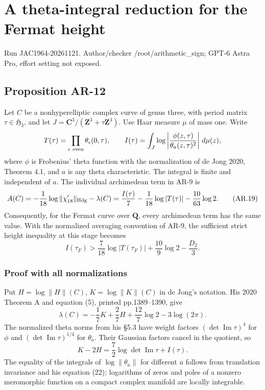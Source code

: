 \section{A theta-integral reduction for the Fermat
height}\label{a-theta-integral-reduction-for-the-fermat-height}

Run JAC1964-20261121. Author/checker /root/arithmetic\_sign; GPT-6 Astra
Pro, effort setting not exposed.

\subsection{Proposition AR-12}\label{proposition-ar-12}

Let \(C\) be a nonhyperelliptic complex curve of genus three, with
period matrix \(\tau\in\mathfrak H_3\), and let
\(J=\mathbf C^3/(\mathbf Z^3+\tau\mathbf Z^3)\). Use Haar measure
\(\mu\) of mass one. Write \[
T(\tau)=\prod_{\epsilon\ {\rm even}}\theta_\epsilon(0,\tau),
\qquad
I(\tau)=\int_J\log\left|
  \frac{\phi(z,\tau)}{\theta_a(z,\tau)^2}
\right|\,d\mu(z),
\] where \(\phi\) is Frobenius' theta function with the normalization of
de Jong 2020, Theorem 4.1, and \(a\) is any theta characteristic. The
integral is finite and independent of \(a\). The individual archimedean
term in AR-9 is \[
A(C)=-\frac1{18}\log\|\chi'_{18}\|_{\rm Hdg}-\lambda(C)
     =\frac{I(\tau)}7-\frac1{18}\log|T(\tau)|
        -\frac{10}{63}\log2.
\tag{AR.19}
\] Consequently, for the Fermat curve over \(\mathbf Q\), every
archimedean term has the same value. With the normalized averaging
convention of AR-9, the sufficient strict height inequality at this
stage becomes \[
I(\tau_F)>
\frac7{18}\log|T(\tau_F)|+\frac{10}{9}\log2-\frac{D_2}{3}.
\tag{AR.20}
\]

\subsubsection{Proof with all
normalizations}\label{proof-with-all-normalizations}

Put \(H=\log\|H\|(C)\), \(K=\log\|K\|(C)\) in de Jong's notation. His
2020 Theorem A and equation (5), printed pp.1389--1390, give \[
\lambda(C)=-\frac17K+\frac27H
                +\frac{12}{7}\log2-3\log(2\pi).
\] The normalized theta norms from his §5.3 have weight factors
\((\det\operatorname{Im}\tau)^4\) for \(\phi\) and
\((\det\operatorname{Im}\tau)^{1/4}\) for \(\theta_a\). Their Gaussian
factors cancel in the quotient, so \[
K-2H=\frac72\log\det\operatorname{Im}\tau+I(\tau).
\] The equality of the integrals of \(\log\|\theta_a\|\) for different
\(a\) follows from translation invariance and his equation (22);
logarithms of zeros and poles of a nonzero meromorphic function on a
compact complex manifold are locally integrable.

